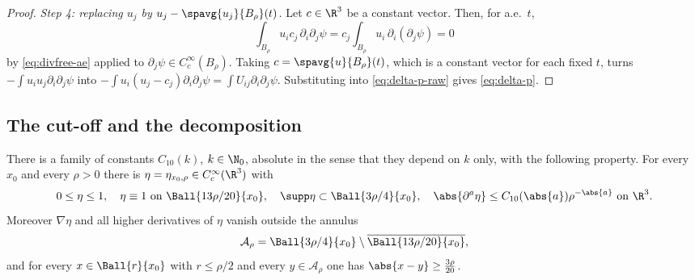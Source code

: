 \documentclass[11pt,reqno]{amsart}
\begin{document}
\begin{proof}
\emph{Step 4: replacing $u_{j}$ by $u_{j}-\spavg{u_{j}}{B_{\rho}}(t)$.} Let
$c\in\R^{3}$ be a constant vector. Then, for a.e.\ $t$,
\[
  \int_{B_{\rho}}u_{i}c_{j}\,\partial_{i}\partial_{j}\psi
  =c_{j}\int_{B_{\rho}}u_{i}\,\partial_{i}(\partial_{j}\psi)
  =0
\]
by \eqref{eq:divfree-ae} applied to $\partial_{j}\psi\in C_{c}^{\infty}(B_{\rho})$.
Taking $c=\spavg{u}{B_{\rho}}(t)$, which is a constant vector for each fixed $t$,
turns $-\int u_{i}u_{j}\partial_{i}\partial_{j}\psi$ into
$-\int u_{i}(u_{j}-c_{j})\partial_{i}\partial_{j}\psi
 =\int U_{ij}\partial_{i}\partial_{j}\psi$. Substituting into
\eqref{eq:delta-p-raw} gives \eqref{eq:delta-p}.
\end{proof}

\subsection{The cut-off and the decomposition}\label{ss:pressure-decomposition}

\begin{lemma}\label{lem:cutoff}
There is a family of constants $C_{10}(k)$, $k\in\N_{0}$, absolute in the sense
that they depend on $k$ only, with the following property. For every $x_{0}$ and
every $\rho>0$ there is $\eta=\eta_{x_{0},\rho}\in C_{c}^{\infty}(\R^{3})$ with
\begin{equation}\label{eq:cutoff}
  0\le\eta\le1,\quad
  \eta\equiv1\ \text{on}\ \Ball{13\rho/20}{x_{0}},\quad
  \supp\eta\subset\Ball{3\rho/4}{x_{0}},\quad
  \abs{\partial^{a}\eta}\le C_{10}(\abs{a})\rho^{-\abs{a}}\ \text{on }\R^{3}.
\end{equation}
Moreover $\nabla\eta$ and all higher derivatives of $\eta$ vanish outside the
annulus
\begin{equation}\label{eq:annulus}
  \mathcal{A}_{\rho}=\Ball{3\rho/4}{x_{0}}\setminus\overline{\Ball{13\rho/20}{x_{0}}},
\end{equation}
and for every $x\in\Ball{r}{x_{0}}$ with $r\le\rho/2$ and every
$y\in\mathcal{A}_{\rho}$ one has $\abs{x-y}\ge\tfrac{3\rho}{20}$.
\end{lemma}
\end{document}
